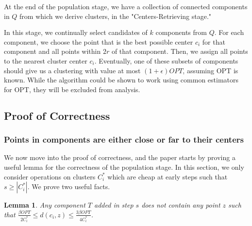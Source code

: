 \documentclass[paper=a4, fontsize=10.5pt]{scrartcl} %
\numberwithin{equation}{section} %
\numberwithin{figure}{section} %
\numberwithin{table}{section} %
\newtheorem{lemma}[theorem]{Lemma}
\begin{document}

At the end of the population stage, we have a collection of connected components in $Q$ from which we derive clusters, in the "Centers-Retrieving stage."

In this stage, we continually select candidates of $k$ components from $Q$.  For each component, we choose the point that is the best possible center $c_i$ for that component and all points within $2r$ of that component.  Then, we assign all points to the nearest cluster center $c_i$.  Eventually, one of these subsets of components should give us a clustering with value at most $(1 + \epsilon) OPT$, assuming OPT is known. While the algorithm could be shown to work using common estimators for OPT, they will be excluded from analysis.

\subsection{Proof of Correctness}

\subsubsection{Points in components are either close or far to their centers}
We now move into the proof of correctness, and the paper starts by proving a useful lemma for the correctness of the population stage.  In this section, we only consider operations on clusters $C^*_i$ which are cheap at early steps such that $s \geq |C^*_i|$.  We prove two useful facts.

\begin{lemma}
Any component $T$ added in step $s$ does not contain any point $z$ such that $\frac{\beta OPT}{2 C^*_i} \leq  d(c_i, z) \leq \frac{3 \beta OPT}{4 C^*_i}$.
\label{lemma:4.2a}
\end{lemma}
\end{document}
